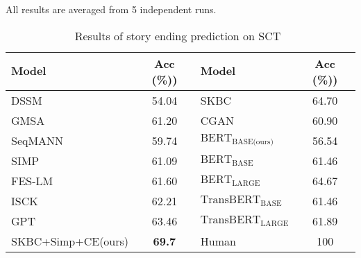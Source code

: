 All results are averaged from
5 independent runs. 
\begin{table}
 \small
\centering
\begin{tabular}{lc||lc}
\hline
$\textbf{Model}$ & Acc (\%))& $\textbf{Model}$ & Acc (\%))\\
\hline
\hline
DSSM& 54.04& SKBC&64.70\\
GMSA& 61.20 & CGAN& 60.90 \\
SeqMANN& 59.74 & $\text{BERT}_\text{BASE(ours)}$&56.54\\
SIMP&61.09 & $\text{BERT}_\text{BASE}$&61.46\\
FES-LM&61.60 & $\text{BERT}_\text{LARGE}$&64.67\\
ISCK& 62.21 & $\text{TransBERT}_\text{BASE}$&61.46\\
GPT& 63.46 & $\text{TransBERT}_\text{LARGE}$&61.89\\
\hline
SKBC+Simp+CE(ours)&\bf{69.7}&Human& 100\\
\hline
\end{tabular}
\caption{Results of story ending prediction on SCT~\protect\footnotemark}
\label{tab:all-models}
\end{table}


